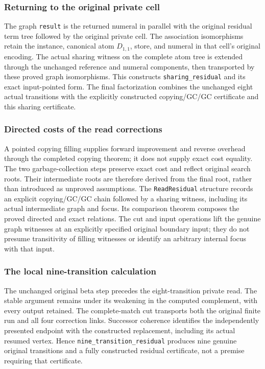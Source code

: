 \subsubsection{Returning to the original private cell}
The graph \texttt{result} is the returned numeral in parallel with the original residual term tree followed by the original private cell.  The association isomorphisms retain the instance, canonical atom $D_{1,1}$, store, and numeral in that cell's original encoding.  The actual sharing witness on the complete atom tree is extended through the unchanged reference and numeral components, then transported by these proved graph isomorphisms.  This constructs \texttt{sharing\_residual} and its exact input-pointed form.  The final factorization combines the unchanged eight actual transitions with the explicitly constructed copying/GC/GC certificate and this sharing certificate.

\subsubsection{Directed costs of the read corrections}
A pointed copying filling supplies forward improvement and reverse overhead through the completed copying theorem; it does not supply exact cost equality.  The two garbage-collection steps preserve exact cost and reflect original search roots.  Their intermediate roots are therefore derived from the final root, rather than introduced as unproved assumptions.  The \texttt{ReadResidual} structure records an explicit copying/GC/GC chain followed by a sharing witness, including its actual intermediate graph and focus.  Its comparison theorem composes the proved directed and exact relations.  The cut and input operations lift the genuine graph witnesses at an explicitly specified original boundary input; they do not presume transitivity of filling witnesses or identify an arbitrary internal focus with that input.

\subsubsection{The local nine-transition calculation}
The unchanged original beta step precedes the eight-transition private read.  The stable argument remains under its weakening in the computed complement, with every output retained.  The complete-match cut transports both the original finite run and all four correction links.  Successor coherence identifies the independently presented endpoint with the constructed replacement, including its actual resumed vertex.  Hence \texttt{nine\_transition\_residual} produces nine genuine original transitions and a fully constructed residual certificate, not a premise requiring that certificate.

